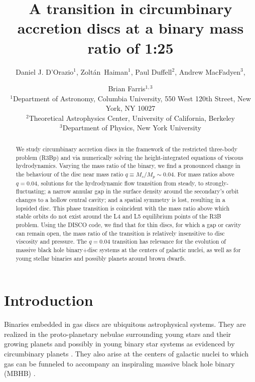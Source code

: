 \documentclass[usenatbib]{mnras}
\begin{document}
\title[A transition in circumbinary discs]{A transition in circumbinary accretion discs at a binary mass ratio of 1:25}

\author[D. J. D'Orazio, Z. Haiman, P. Duffell, A. I. MacFadyen, B. D. Farris]{Daniel J. D'Orazio$^1$,
  Zolt\'an~Haiman$^1$,
  Paul Duffell$^2$, 
  Andrew MacFadyen$^3$, 
  \and Brian Farris$^{1,3}$  \\
     $^1$Department of Astronomy, Columbia University, 550 West 120th Street, New York, NY 10027 \\
     $^2$Theoretical Astrophysics Center, University of California, Berkeley \\
     $^3$Department of Physics, New York University}

\maketitle

\begin{abstract}
We study circumbinary accretion discs in the framework of the
restricted three-body problem (R3Bp) and via numerically solving the
height-integrated equations of viscous hydrodynamics. Varying the mass
ratio of the binary, we find a pronounced change in the behaviour of
the disc near mass ratio $q \equiv M_s/M_p \sim 0.04$.  For mass
ratios above $q=0.04$, solutions for the hydrodynamic flow transition
from steady, to strongly-fluctuating; a narrow annular gap in the
surface density around the secondary's orbit changes to a hollow
central cavity; and a spatial symmetry is lost, resulting in a
lopsided disc. This phase transition is coincident with the mass ratio
above which stable orbits do not exist around the L4 and L5
equilibrium points of the R3B problem.  Using the DISCO code, we find
that for thin discs, for which a gap or cavity can remain open, the
mass ratio of the transition is relatively insensitive to disc
viscosity and pressure.  The $q=0.04$ transition has relevance for the
evolution of massive black hole binary+disc systems at the centers of
galactic nuclei, as well as for young stellar binaries and possibly
planets around brown dwarfs.
\end{abstract}




\section{Introduction}
Binaries embedded in gas discs are ubiquitous astrophysical systems. They are realized in the proto-planetary nebulae surrounding young stars and their growing planets \citep{KleyNelson:2012:rev} and possibly in young binary star systems as evidenced by circumbinary planets \citep[\textit{e.g.}][]{ Orosz:2012Sci}. They also arise at the centers of galactic nuclei to which gas can be funneled to accompany an inspiraling massive black hole binary (MBHB) \citep[][and see recent reviews by \cite{Dotti:2012:rev,Mayer:2013:MBHBGasRev}]{Barnes:1996}. 
\end{document}
